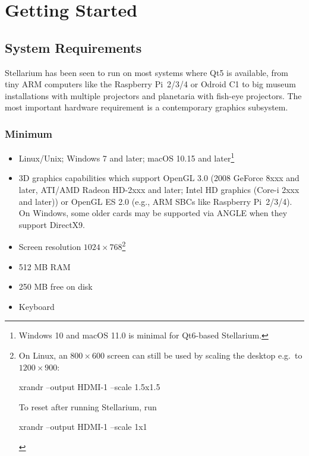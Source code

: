 

\chapter{Getting Started}
\label{ch:GettingStarted}

\section{System Requirements}
\label{sec:GettingStarted:SystemRequirements}

Stellarium has been seen to run on most systems where Qt5 is
available, from tiny ARM computers like the Raspberry Pi~2/3/4
or Odroid C1 to big museum installations with multiple projectors 
and planetaria with fish-eye projectors. 
The most important hardware requirement is a contemporary graphics subsystem.


\subsection{Minimum}
\begin{itemize}
\item Linux/Unix; Windows 7 and later; macOS 10.15 and later\footnote{Windows 10 and macOS 11.0 is minimal for Qt6-based Stellarium.}
\item 3D graphics capabilities which support OpenGL 3.0 (2008
  GeForce 8xxx and later, ATI/AMD Radeon HD-2xxx and later; Intel HD
  graphics (Core-i 2xxx and later)) or OpenGL ES 2.0
  (e.g., ARM SBCs like Raspberry Pi~2/3/4). On Windows, some older cards
  may be supported via ANGLE when they support DirectX9.
\item Screen resolution $1024\times768$\footnote{On Linux, an $800\times600$ screen can still be used by scaling the desktop e.g.\ to $1200\times900$:
  \begin{commands}
    xrandr --output HDMI-1 --scale 1.5x1.5
  \end{commands}
  To reset after running Stellarium, run
  \begin{commands}
    xrandr --output HDMI-1 --scale 1x1
  \end{commands}}
\item 512 MB RAM
\item 250 MB free on disk
\item Keyboard
\end{itemize}

